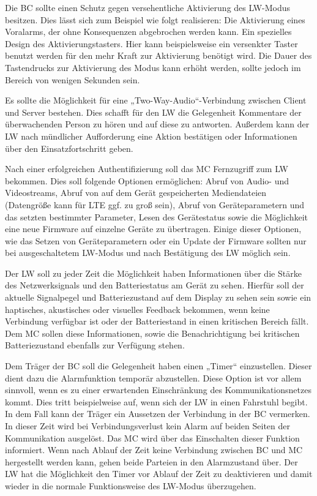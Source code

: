 \documentclass[thesis.tex]{subfiles}
\begin{document}
Die BC sollte einen Schutz gegen versehentliche Aktivierung des LW-Modus besitzen.
Dies lässt sich zum Beispiel wie folgt realisieren: Die Aktivierung eines Voralarms, der ohne Konsequenzen abgebrochen werden kann.
Ein spezielles Design des Aktivierungstasters. Hier kann beispielsweise ein versenkter Taster benutzt werden für den mehr Kraft zur
Aktivierung benötigt wird.
Die Dauer des Tastendrucks zur Aktivierung des Modus kann erhöht werden, sollte jedoch im Bereich von wenigen Sekunden sein.

Es sollte die Möglichkeit für eine „Two-Way-Audio“-Verbindung zwischen Client und Server bestehen.
Dies schafft für den LW die Gelegenheit Kommentare der überwachenden Person zu hören und auf diese zu antworten.
Außerdem kann der LW nach mündlicher Aufforderung eine Aktion bestätigen oder Informationen über den Einsatzfortschritt geben.

Nach einer erfolgreichen Authentifizierung soll das MC Fernzugriff zum LW bekommen.
Dies soll folgende Optionen ermöglichen: Abruf von Audio- und Videostreams, Abruf von auf dem Gerät gespeicherten Mediendateien
(Datengröße kann für LTE ggf. zu groß sein), Abruf von Geräteparametern und das setzten bestimmter Parameter, Lesen des Gerätestatus
sowie die Möglichkeit eine neue Firmware auf einzelne Geräte zu übertragen.
Einige dieser Optionen, wie das Setzen von Geräteparametern oder ein Update der Firmware sollten nur bei ausgeschaltetem LW-Modus
und nach Bestätigung des LW möglich sein.

Der LW soll zu jeder Zeit die Möglichkeit haben Informationen über die Stärke des Netzwerksignals und den Batteriestatus am Gerät zu sehen.
Hierfür soll der aktuelle Signalpegel und Batteriezustand auf dem Display zu sehen sein sowie ein haptisches, akustisches oder visuelles
Feedback bekommen, wenn keine Verbindung verfügbar ist oder der Batteriestand in einen kritischen Bereich fällt.
Dem MC sollen diese Informationen, sowie die Benachrichtigung bei kritischen Batteriezustand ebenfalls zur Verfügung stehen.

Dem Träger der BC soll die Gelegenheit haben einen „Timer“ einzustellen.
Dieser dient dazu die Alarmfunktion temporär abzustellen.
Diese Option ist vor allem sinnvoll, wenn es zu einer erwartenden Einschränkung des Kommunikationsnetzes kommt.
Dies tritt beispielweise auf, wenn sich der LW in einen Fahrstuhl begibt.
In dem Fall kann der Träger ein Aussetzen der Verbindung in der BC vermerken.
In dieser Zeit wird bei Verbindungsverlust kein Alarm auf beiden Seiten der Kommunikation ausgelöst.
Das MC wird über das Einschalten dieser Funktion informiert.
Wenn nach Ablauf der Zeit keine Verbindung zwischen BC und MC hergestellt werden kann, gehen beide Parteien in den Alarmzustand über.
Der LW hat die Möglichkeit den Timer vor Ablauf der Zeit zu deaktivieren und damit wieder in die normale Funktionsweise des LW-Modus überzugehen.
\end{document}
